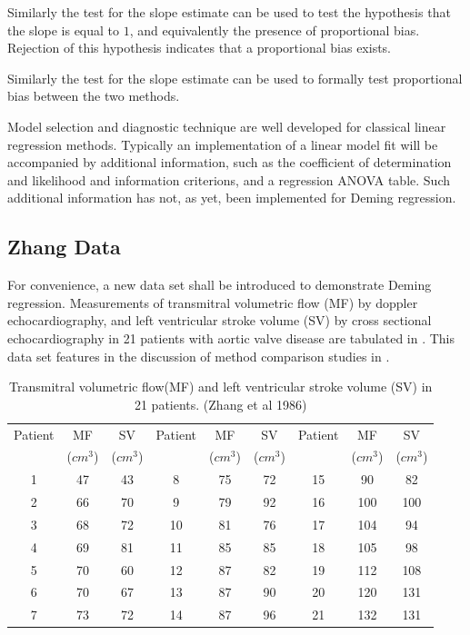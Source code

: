 \documentclass[12pt, a4paper]{report}
\theoremstyle{plain}
\theoremstyle{definition}
\theoremstyle{remark}
\begin{document}
Similarly the test for the slope estimate can be used to test the hypothesis that the slope is equal to $1$, and equivalently the presence of proportional bias. Rejection of this hypothesis indicates that a proportional bias exists.

Similarly the test for the slope estimate can be used to formally test proportional bias between the two methods.



Model selection and diagnostic technique are well developed for classical linear regression methods. Typically an implementation of a linear model fit will be accompanied by additional information, such as the coefficient of determination and likelihood and information criterions, and a regression ANOVA table. Such additional information has not, as yet, been implemented for Deming regression.




\subsection{Zhang Data}
For convenience, a new data set shall be introduced to demonstrate
Deming regression. Measurements of transmitral volumetric flow
(MF) by doppler echocardiography, and left ventricular stroke
volume (SV) by cross sectional echocardiography in 21 patients
with aortic valve disease are tabulated in \citet{zhang}. This
data set features in the discussion of method comparison studies
in \citet[p.398]{AltmanBook} .


\begin{table}[h!]
	\begin{center}
		\begin{tabular}{|c|c|c||c|c|c||c|c|c|}
			\hline
			Patient & MF  & SV  & Patient & MF  & SV  & Patient & MF  & SV \\
			&($cm^{3}$)&  ($cm^{3}$) & &($cm^{3}$)&  ($cm^{3}$) & &($cm^{3}$)&  ($cm^{3}$)
			\\
			\hline
			1 & 47 & 43 &  8 & 75 & 72 &  15 & 90 & 82 \\
			2 & 66 & 70 & 9 & 79 & 92 &  16 & 100 & 100 \\
			3 & 68 & 72 & 10 & 81 & 76 & 17 & 104 & 94 \\
			4 & 69 & 81 & 11 & 85 & 85 &  18 & 105 & 98 \\
			5 & 70 & 60 & 12 & 87 & 82 & 19 & 112 & 108 \\
			6 & 70 & 67 & 13 & 87 & 90 & 20 & 120 & 131 \\
			7 & 73 & 72 & 14 & 87 & 96 &  21 & 132 & 131 \\
			
			\hline
		\end{tabular}
		\caption{Transmitral volumetric flow(MF) and left ventricular
			stroke volume (SV) in 21 patients. (Zhang et al 1986)}
	\end{center}
\end{table}
\end{document}
